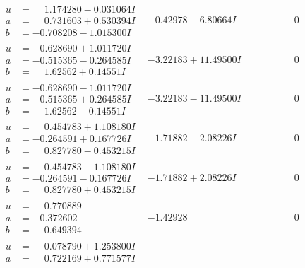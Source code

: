 \documentclass[1p]{elsarticle_modified}
\theoremstyle{definition}
\begin{document}
$$\begin{array}{c|c|c}
 \hline 
\begin{aligned}
u &= \phantom{-}1.174280 - 0.031064 I \\
a &= \phantom{-}0.731603 + 0.530394 I \\
b &= -0.708208 - 1.015300 I\end{aligned}
 & -0.42978 - 6.80664 I & \phantom{-0.000000 } 0 \\ \hline\begin{aligned}
u &= -0.628690 + 1.011720 I \\
a &= -0.515365 - 0.264585 I \\
b &= \phantom{-}1.62562 + 0.14551 I\end{aligned}
 & -3.22183 + 11.49500 I & \phantom{-0.000000 } 0 \\ \hline\begin{aligned}
u &= -0.628690 - 1.011720 I \\
a &= -0.515365 + 0.264585 I \\
b &= \phantom{-}1.62562 - 0.14551 I\end{aligned}
 & -3.22183 - 11.49500 I & \phantom{-0.000000 } 0 \\ \hline\begin{aligned}
u &= \phantom{-}0.454783 + 1.108180 I \\
a &= -0.264591 + 0.167726 I \\
b &= \phantom{-}0.827780 - 0.453215 I\end{aligned}
 & -1.71882 - 2.08226 I & \phantom{-0.000000 } 0 \\ \hline\begin{aligned}
u &= \phantom{-}0.454783 - 1.108180 I \\
a &= -0.264591 - 0.167726 I \\
b &= \phantom{-}0.827780 + 0.453215 I\end{aligned}
 & -1.71882 + 2.08226 I & \phantom{-0.000000 } 0 \\ \hline\begin{aligned}
u &= \phantom{-}0.770889\phantom{ +0.000000I} \\
a &= -0.372602\phantom{ +0.000000I} \\
b &= \phantom{-}0.649394\phantom{ +0.000000I}\end{aligned}
 & -1.42928\phantom{ +0.000000I} & \phantom{-0.000000 } 0 \\ \hline\begin{aligned}
u &= \phantom{-}0.078790 + 1.253800 I \\
a &= \phantom{-}0.722169 + 0.771577 I \\

\end{aligned}
\end{array}$$
\end{document}

